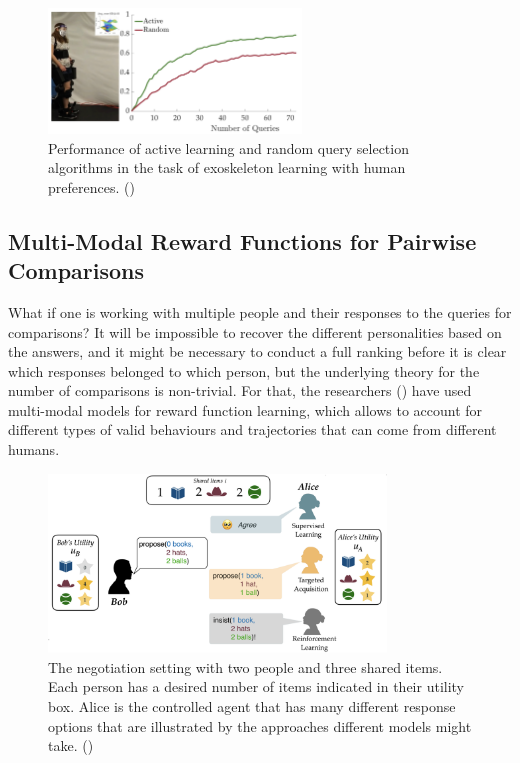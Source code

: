 \documentclass[
  letterpaper,
  DIV=11,
  numbers=noendperiod,
  oneside]{scrreprt}
\theoremstyle{remark}
\begin{document}
\begin{figure}

{\centering \includegraphics[width=0.6\textwidth,height=\textheight]{src/Figures/robo_graph.png}

}

\caption{Performance of active learning and random query selection
algorithms in the task of exoskeleton learning with human preferences.
()}

\end{figure}%

\subsection{Multi-Modal Reward Functions for Pairwise
Comparisons}\label{multi-modal-reward-functions-for-pairwise-comparisons}

What if one is working with multiple people and their responses to the
queries for comparisons? It will be impossible to recover the different
personalities based on the answers, and it might be necessary to conduct
a full ranking before it is clear which responses belonged to which
person, but the underlying theory for the number of comparisons is
non-trivial. For that, the researchers
() have used
multi-modal models for reward function learning, which allows to account
for different types of valid behaviours and trajectories that can come
from different humans.

\begin{figure}

{\centering \includegraphics[width=0.8\textwidth,height=\textheight]{src/Figures/negotiation.png}

}

\caption{The negotiation setting with two people and three shared items.
Each person has a desired number of items indicated in their utility
box. Alice is the controlled agent that has many different response
options that are illustrated by the approaches different models might
take. ()}

\end{figure}%
\end{document}
